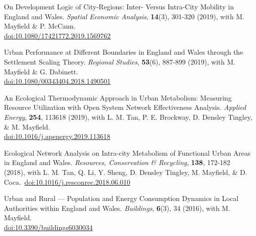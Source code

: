 \documentclass[10pt]{article}
\begin{document}
\begin{etaremune}[leftmargin=0ex, topsep=0ex]
	\item On Development Logic of City-Regions: Inter- Versus Intra-City Mobility in England and Wales. \emph{Spatial Economic Analysis}, \textbf{14}(3), 301-320 (2019), with M. Mayfield \& P. McCann.~\\\href{https://doi.org/10.1080/17421772.2019.1569762}{doi:10.1080/17421772.2019.1569762}
	
	\item Urban Performance at Different Boundaries in England and Wales through the Settlement Scaling Theory. \emph{Regional Studies}, \textbf{53}(6), 887-899 (2019), with M. Mayfield \& G. Dabinett.~\\\href{http://dx.doi.org/10.1080/00343404.2018.1490501}{doi:10.1080/00343404.2018.1490501}

	\item An Ecological Thermodynamic Approach in Urban Metabolism: Measuring Resource Utilization with Open System Network Effectiveness Analysis. \emph{Applied Energy}, \textbf{254}, 113618 (2019), with L. M. Tan, P. E. Brockway, D. Densley Tingley, \& M. Mayfield.~\\\href{https://doi.org/10.1016/j.apenergy.2019.113618}{doi:10.1016/j.apenergy.2019.113618}
			
	\item Ecological Network Analysis on Intra-city Metabolism of Functional Urban Areas in England and Wales. \emph{Resources, Conservation \& Recycling}, \textbf{138}, 172-182 (2018), with L. M. Tan, Q. Li, Y. Sheng, D. Densley Tingley, M. Mayfield, \& D. Coca.~\href{https//doi.org/10.1016/j.resconrec.2018.06.010}{doi:10.1016/j.resconrec.2018.06.010}\label{sure.net}

	\item Urban and Rural --- Population and Energy Consumption Dynamics in Local Authorities within England and Wales. \emph{Buildings}, \textbf{6}(3), 34 (2016), with M. Mayfield.~\\\href{http://dx.doi.org/10.3390/buildings6030034}{doi:10.3390/buildings6030034}
	
\end{etaremune}
\renewcommand{\labelenumi}{R\theenumi.}
\end{document}
